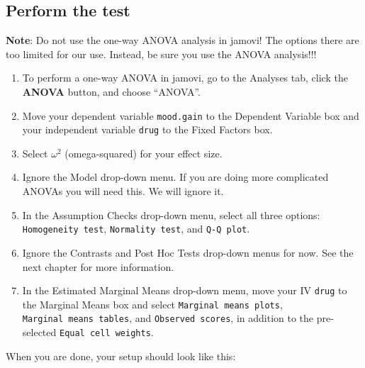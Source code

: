 \documentclass[
]{book}
\begin{document}
\hypertarget{perform-the-test-6}{%
\subsection{Perform the test}\label{perform-the-test-6}}

\textbf{Note}: Do not use the one-way ANOVA analysis in jamovi! The options there are too limited for our use. Instead, be sure you use the ANOVA analysis!!!

\begin{enumerate}
\def\labelenumi{\arabic{enumi}.}
\item
  To perform a one-way ANOVA in jamovi, go to the Analyses tab, click the \textbf{ANOVA} button, and choose ``ANOVA''.
\item
  Move your dependent variable \texttt{mood.gain} to the Dependent Variable box and your independent variable \texttt{drug} to the Fixed Factors box.
\item
  Select \(\omega^2\) (omega-squared) for your effect size.
\item
  Ignore the Model drop-down menu. If you are doing more complicated ANOVAs you will need this. We will ignore it.
\item
  In the Assumption Checks drop-down menu, select all three options: \texttt{Homogeneity\ test}, \texttt{Normality\ test}, and \texttt{Q-Q\ plot}.
\item
  Ignore the Contrasts and Post Hoc Tests drop-down menus for now. See the next chapter for more information.
\item
  In the Estimated Marginal Means drop-down menu, move your IV \texttt{drug} to the Marginal Means box and select \texttt{Marginal\ means\ plots}, \texttt{Marginal\ means\ tables}, and \texttt{Observed\ scores}, in addition to the pre-selected \texttt{Equal\ cell\ weights}.
\end{enumerate}

When you are done, your setup should look like this:
\end{document}
